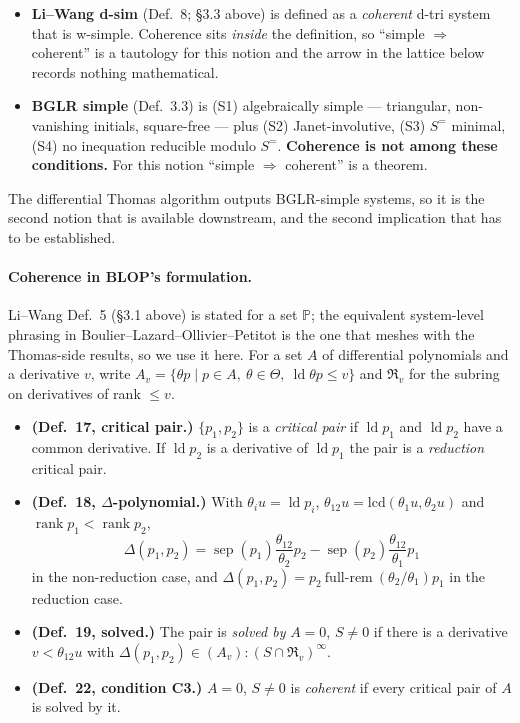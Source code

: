 \documentclass[11pt]{article}
\newcommand{\satalg}[2]{(#1)\!:\!#2^{\infty}}
\newcommand{\ld}{\operatorname{ld}}
\newcommand{\sep}{\operatorname{sep}}
\newcommand{\R}{\mathfrak{R}}
\newcommand{\PP}{\mathbb{P}}
\begin{document}
\begin{itemize}
  \item \textbf{Li--Wang d-sim} (Def.~8; \S3.3 above) is defined as a
        \emph{coherent} d-tri system that is w-simple. Coherence sits
        \emph{inside} the definition, so ``simple $\Rightarrow$ coherent'' is a
        tautology for this notion and the arrow in the lattice below records
        nothing mathematical.
  \item \textbf{BGLR simple} (Def.~3.3) is (S1) algebraically simple ---
        triangular, non-vanishing initials, square-free --- plus (S2)
        Janet-involutive, (S3) $S^=$ minimal, (S4) no inequation reducible
        modulo $S^=$. \textbf{Coherence is not among these conditions.} For this
        notion ``simple $\Rightarrow$ coherent'' is a theorem.
\end{itemize}

\noindent
The differential Thomas algorithm outputs BGLR-simple systems, so it is the
second notion that is available downstream, and the second implication that has
to be established.

\paragraph{Coherence in BLOP's formulation.} Li--Wang Def.~5 (\S3.1 above) is
stated for a set $\PP$; the equivalent system-level phrasing in
Boulier--Lazard--Ollivier--Petitot is the one that meshes with the Thomas-side
results, so we use it here. For a set $A$ of differential polynomials and a
derivative $v$, write $A_v=\{\theta p \mid p\in A,\ \theta\in\Theta,\
\ld\theta p\le v\}$ and $\R_v$ for the subring on derivatives of rank $\le v$.

\begin{itemize}
  \item \textbf{(Def.~17, critical pair.)} $\{p_1,p_2\}$ is a \emph{critical
        pair} if $\ld p_1$ and $\ld p_2$ have a common derivative. If $\ld p_2$
        is a derivative of $\ld p_1$ the pair is a \emph{reduction} critical
        pair.
  \item \textbf{(Def.~18, $\Delta$-polynomial.)} With
        $\theta_iu=\ld p_i$, $\theta_{12}u=\mathrm{lcd}(\theta_1u,\theta_2u)$ and
        $\operatorname{rank}p_1<\operatorname{rank}p_2$,
        \[
          \Delta(p_1,p_2)=\sep(p_1)\frac{\theta_{12}}{\theta_2}p_2
                         -\sep(p_2)\frac{\theta_{12}}{\theta_1}p_1
        \]
        in the non-reduction case, and
        $\Delta(p_1,p_2)=p_2\ \mathrm{full\text{-}rem}\ (\theta_2/\theta_1)p_1$
        in the reduction case.
  \item \textbf{(Def.~19, solved.)} The pair is \emph{solved by} $A=0$,
        $S\ne 0$ if there is a derivative $v<\theta_{12}u$ with
        $\Delta(p_1,p_2)\in\satalg{A_v}{(S\cap\R_v)}$.
  \item \textbf{(Def.~22, condition C3.)} $A=0$, $S\ne0$ is \emph{coherent} if
        every critical pair of $A$ is solved by it.
\end{itemize}
\end{document}
